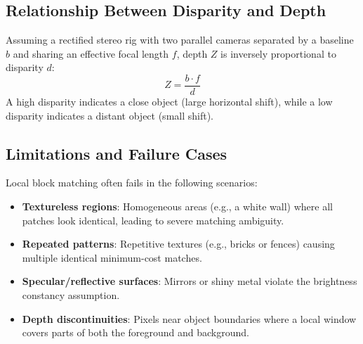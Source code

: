 \subsection{Relationship Between Disparity and Depth}
Assuming a rectified stereo rig with two parallel cameras separated by a baseline $b$ and sharing an effective focal length $f$, depth $Z$ is inversely proportional to disparity $d$:
\[
  Z = \frac{b \cdot f}{d}
\]
A high disparity indicates a close object (large horizontal shift), while a low disparity indicates a distant object (small shift).

\subsection{Limitations and Failure Cases}
Local block matching often fails in the following scenarios:
\begin{itemize}
    \item \textbf{Textureless regions}: Homogeneous areas (e.g., a white wall) where all patches look identical, leading to severe matching ambiguity.
    \item \textbf{Repeated patterns}: Repetitive textures (e.g., bricks or fences) causing multiple identical minimum-cost matches.
    \item \textbf{Specular/reflective surfaces}: Mirrors or shiny metal violate the brightness constancy assumption.
    \item \textbf{Depth discontinuities}: Pixels near object boundaries where a local window covers parts of both the foreground and background.
\end{itemize}